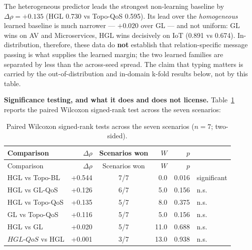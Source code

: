 The heterogeneous predictor leads the strongest non-learning baseline by \(\Delta\rho = +0.135\)
(HGL 0.730 vs Topo-QoS 0.595). Its lead over the \emph{homogeneous} learned baseline is much narrower
--- \(+0.020\) over GL --- and not uniform: GL wins on AV and Microservices, HGL wins decisively on
IoT (0.891 vs 0.674). In-distribution, therefore, these data do \textbf{not} establish that
relation-specific message passing is what supplies the learned margin; the two learned families are
separated by less than the across-seed spread. The claim that typing matters is carried by the
out-of-distribution and in-domain k-fold results below, not by this table.

\textbf{Significance testing, and what it does and does not license.} Table~\ref{tab:9} reports the
paired Wilcoxon signed-rank test across the seven scenarios:

\begin{longtable}[]{@{}lrcrrl@{}}
\caption{Paired Wilcoxon signed-rank tests across the seven scenarios (\(n = 7\); two-sided).\label{tab:9}}\tabularnewline
\toprule
Comparison & \(\Delta\rho\) & Scenarios won & \(W\) & \(p\) & \\
\midrule
\endfirsthead
\toprule
Comparison & \(\Delta\rho\) & Scenarios won & \(W\) & \(p\) & \\
\midrule
\endhead
HGL vs Topo-BL & +0.544 & 7/7 & 0.0 & 0.016 & significant \\
HGL vs GL-QoS & +0.126 & 6/7 & 5.0 & 0.156 & n.s. \\
HGL vs Topo-QoS & +0.135 & 5/7 & 8.0 & 0.375 & n.s. \\
GL vs Topo-QoS & +0.116 & 5/7 & 5.0 & 0.156 & n.s. \\
HGL vs GL & +0.020 & 5/7 & 11.0 & 0.688 & n.s. \\
\(HGL\text{-}QoS\) vs HGL & +0.001 & 3/7 & 13.0 & 0.938 & n.s. \\
\bottomrule
\end{longtable}

